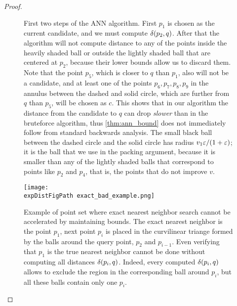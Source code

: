 \documentclass[a4paper,UKenglish,cleveref, autoref]{lipics-v2019}
\def \expDistFigPath {pics/}
\begin{document}
\begin{proof}
\begin{figure}[ht!]
\caption{First two steps of the ANN algorithm. First $p_1$ is 
chosen as the current candidate, and we must compute $\delta(p_2, q)$. After that the algorithm will not compute
distance to any of the points inside the heavily shaded ball or outside the lightly shaded ball that are centered at $p_2$, because their lower bounds allow us to discard them. Note that the point $p_5$, which
is closer to $q$ than $p_1$, also will not be a candidate, and at least one of the points $p_6,p_7,p_8,p_9$ in the annulus between the dashed and solid circle, which are further from $q$ than $p_5$, will be chosen as $c$. This shows that in our algorithm the distance from the candidate to $q$ can drop \textit{slower} than in the bruteforce algorithm, thus \cref{thm:ann_bound} does not immediately follow from standard backwards analysis. The small black ball between the dashed circle and the solid circle has radius $v_1 \varepsilon / (1 + \varepsilon)$; it is the ball that we use in the packing argument, because it is smaller than any of the lightly shaded balls that correspond to points like $p_2$ and $p_4$, that is, the points that do not improve $v$.}
\label{fig:ann_illustration}
\end{figure}


\begin{figure}[hb!]
    \texttt{[image: \\expDistFigPath exact\_bad\_example.png]}
    \caption{Example of point set where exact nearest neighbor search cannot be accelerated by maintaining bounds.
    The exact nearest neighbor is the point $p_1$, next point $p_i$ is placed 
    in the curvilinear triange formed by the balls around the query point, $p_2$ and $p_{i-1}$. Even verifying that $p_1$
    is the true nearest neighbor cannot be done without computing all distances $\delta(p_i,q)$. Indeed, every computed
    $\delta(p_i,q)$ allows to exclude the region in the corresponding ball around $p_i$, but all these balls contain only one $p_i$.}
    \label{fig:exact_bad_example}
\end{figure}





\end{proof}
\end{document}
